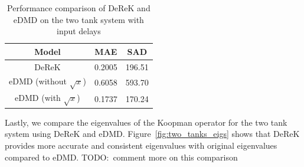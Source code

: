 \documentclass[conference]{IEEEtran}
\newcommand{\todo}[1]{{{\color{red} TODO:~#1	}} }
\begin{document}
\begin{table}[htbp]\label{tab:two_tanks_results}
    \caption{Performance comparison of DeReK and eDMD on the two tank system with input delays}
    \begin{center}
        \begin{tabular}{c| S[table-format=1.4] S[table-format=3.2]}
            \toprule
            \textbf{Model}              & \textbf{MAE} & \textbf{SAD} \\
            \midrule
            DeReK                       & 0.2005       & 196.51       \\
            eDMD (without \(\sqrt{x}\)) & 0.6058       & 593.70       \\
            eDMD (with \(\sqrt{x}\))    & 0.1737       & 170.24       \\
            \bottomrule
        \end{tabular}
    \end{center}
\end{table}

Lastly, we compare the eigenvalues of the Koopman operator for the two tank system using DeReK and eDMD. Figure~\ref{fig:two_tanks_eigs} shows that DeReK provides more accurate and consistent eigenvalues with original eigenvalues compared to eDMD. \todo{comment more on this comparison}
\end{document}
